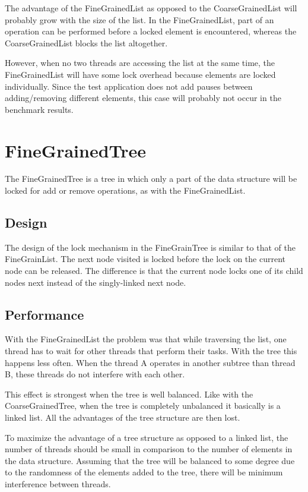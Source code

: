 \documentclass[a4paper]{article}
\begin{document}
The advantage of the FineGrainedList as opposed to the CoarseGrainedList will
probably grow with the size of the list. In the FineGrainedList, part of an
operation can be performed before a locked element is encountered, whereas the
CoarseGrainedList blocks the list altogether.

However, when no two threads are accessing the list at the same time, the
FineGrainedList will have some lock overhead because elements are locked
individually. Since the test application does not add pauses between
adding/removing different elements, this case will probably not occur in the
benchmark results.

\section{FineGrainedTree}

The FineGrainedTree is a tree in which only a part of the data structure
will be locked for add or remove operations, as with the FineGrainedList.

\subsection{Design}

The design of the lock mechanism in the FineGrainTree is similar to that of the
FineGrainList. The next node visited is locked before the lock on the current
node can be released. The difference is that the current node locks one of its
child nodes next instead of the singly-linked next node.

\subsection{Performance}

With the FineGrainedList the problem was that while traversing the list, one
thread has to wait for other threads that perform their tasks. With the tree
this happens less often. When the thread A operates in another subtree than
thread B, these threads do not interfere with each other.

This effect is strongest when the tree is well balanced. Like with the
CoarseGrainedTree, when the tree is completely unbalanced it basically is
a linked list. All the advantages of the tree structure are then lost.

To maximize the advantage of a tree structure as opposed to a linked list, the
number of threads should be small in comparison to the number of elements in the
data structure. Assuming that the tree will be balanced to some degree due to the
randomness of the elements added to the tree, there will be minimum interference
between threads.
\end{document}
